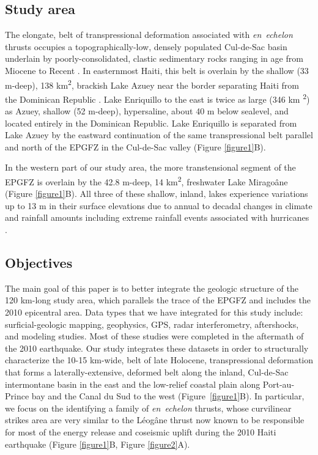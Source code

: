 \documentclass[linenumbers,draft]{agujournal}
\begin{document}
\subsection{Study area}
The elongate, belt of transpressional deformation associated with \textit{en~echelon} thrusts occupies a topographically-low, densely populated Cul-de-Sac basin underlain by poorly-consolidated, clastic sedimentary rocks ranging in age from Miocene to Recent \citep{butterlin1960geologie,mann1995actively,bachhuber2010,rathje2011damage,terrier2014revision,saint2015seismotectonics}. In easternmost Haiti, this belt is overlain by the shallow (33 m-deep), 138 km\textsuperscript{2}, brackish Lake Azuey near the border separating Haiti from the Dominican Republic \citep{wright2015factors,piasecki2016bathymetric}. Lake Enriquillo to the east is twice as large (346 km \textsuperscript{2}) as Azuey, shallow (52 m-deep), hypersaline, about 40 m below sealevel, and located entirely in the Dominican Republic. Lake Enriquillo is separated from Lake Azuey by the eastward continuation of the same transpressional belt parallel and north of the EPGFZ in the Cul-de-Sac valley \citep{mann1995actively} (Figure \ref{figure1}B). 

In the western part of our study area, the more transtensional segment of the EPGFZ is overlain by the 42.8 m-deep, 14 km\textsuperscript{2}, freshwater Lake Mirago\^ane (Figure \ref{figure1}B). All three of these shallow, inland, lakes experience variations up to 13 m in their surface elevations due to annual to decadal changes in climate and rainfall amounts including extreme rainfall events associated with hurricanes \citep{wright2015factors,piasecki2016bathymetric,moknatian2017development,rico2017hydrodynamic}.  

\subsection{Objectives}
The main goal of this paper is to better integrate the geologic structure of the 120 km-long study area, which parallels the trace of the EPGFZ and includes the 2010 epicentral area. Data types that we have integrated for this study include: surficial-geologic mapping, geophysics, GPS, radar interferometry, aftershocks, and modeling studies. Most of these studies were completed in the aftermath of the 2010 earthquake. Our study integrates these datasets in order to structurally characterize the 10-15 km-wide, belt of late Holocene, transpressional deformation that forms a laterally-extensive, deformed belt along the inland, Cul-de-Sac intermontane basin in the east and the low-relief coastal plain along Port-au-Prince bay and the Canal du Sud to the west (Figure~\ref{figure1}B). In particular, we focus on the identifying a family of \textit{en~echelon} thrusts, whose curvilinear strikes area are very similar to the L\'eog\^ane thrust now known to be responsible for most of the energy release and coseismic uplift during the 2010 Haiti earthquake \citep{calais2010transpressional,douilly2013crustal,douilly2015three} (Figure \ref{figure1}B, Figure \ref{figure2}A).
\end{document}

